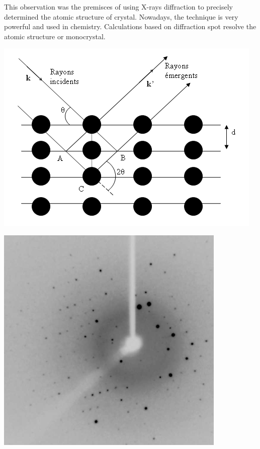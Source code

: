 \documentclass[a4paper,12pt]{report}
\begin{document}
This observation was the premisces of using X-rays diffraction to precisely determined the atomic structure of crystal.
Nowadays, the technique is very powerful and used in chemistry. Calculations based on diffraction spot resolve the atomic structure or monocrystal.

\begin{multicols}{2}
  \begin{center}
    \includegraphics[scale=0.5]{diffraction.jpg}
  \end{center}
  \columnbreak
  \begin{center}
    \includegraphics[scale=0.4]{crystal.jpg}
  \end{center}
\end{multicols}
\end{document}
